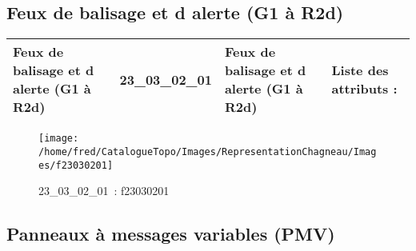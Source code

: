 \documentclass[12pt,titlepage]{book}
\begin{document}
\subsection{Feux de balisage et d alerte (G1 à R2d)}
\noindent
\vspace{\baselineskip}

\renewcommand{\arraystretch}{1.2}
\begin{supertabular}{|p{10cm}|c|p{13cm}|p{12cm}|}
 Feux de balisage et d alerte (G1 à R2d) & 23\_03\_02\_01 & Feux de balisage et d alerte (G1 à R2d) & Liste des attributs :
\begin{enumerate}
\end{enumerate}
\\
\hline
\end{supertabular}
\begin{figure}[h!]
  \hfill         %
  \begin{minipage}[t]{3cm}
    \begin{center}
      \texttt{[image: /home/fred/CatalogueTopo/Images/RepresentationChagneau/Images/f23030201]}
      \caption[~23\_03\_02\_01]{\small{23\_03\_02\_01~:} \tiny{f23030201}}\label{f23030201}
    \end{center}
  \end{minipage}
\end{figure}


\subsection{Panneaux à messages variables (PMV)}
\noindent
\vspace{\baselineskip}
\end{document}
